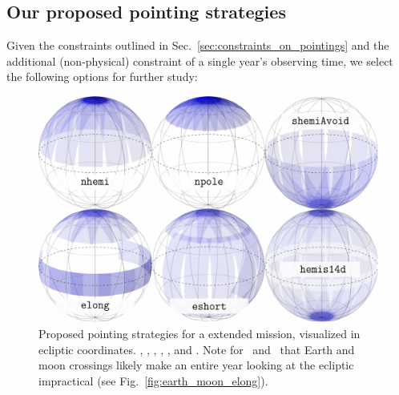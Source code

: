 \subsection{Our proposed pointing strategies}
\label{sec:proposed_pointings}
Given the constraints outlined in Sec.~\ref{sec:constraints_on_pointings} and the additional (non-physical) constraint of a single year's observing time, we select the following options for further study:

\begin{figure}[ht]
	\includegraphics{figures/proposed_pointings_texttt.pdf}
	\caption{Proposed pointing strategies for a \tess extended mission, visualized in ecliptic coordinates. \nhemi, \npole, \shemiAvoid, \elong, \eshort, and \hemis. Note for \elong\ and \eshort\ that Earth and moon crossings likely make an entire year looking at the ecliptic impractical (see Fig.~\protect\ref{fig:earth_moon_elong}).}
	\label{fig:proposed_pointings}
\end{figure}

